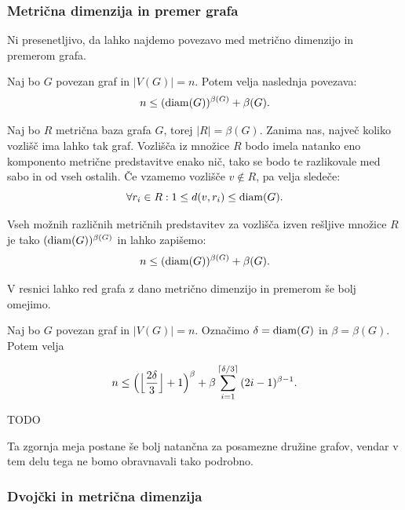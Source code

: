 \documentclass[mat1, tisk]{fmfdelo}
\newcommand{\1}{(1, 1, \ldots, 1)}
\newcommand{\2}{(2, 2, \ldots, 2)}
\begin{document}
\subsubsection{Metrična dimenzija in premer grafa} \label{ss:mdim_premer}

Ni presenetljivo, da lahko najdemo povezavo med metrično dimenzijo in premerom grafa.

\begin{trditev}\label{trd:groba_meja_mdim_premer}
    Naj bo $G$ povezan graf in $|V(G)| = n$. Potem velja naslednja povezava:
    $$n \leq ({\rm diam}(G))^{\beta (G)} + \beta (G). $$
\end{trditev}

\begin{dokaz}
    Naj bo $R$ metrična baza grafa $G$, torej $|R| = \beta(G).$ Zanima nas, največ koliko 
    vozlišč ima lahko tak graf. Vozlišča iz množice $R$ bodo imela natanko eno 
    komponento metrične predstavitve enako nič, tako se bodo te razlikovale med sabo in od
    vseh ostalih. Če vzamemo vozlišče $v \notin R$, pa velja sledeče:
    $$\forall r_i \in R: 1 \leq d(v, r_i) \leq {\rm diam}(G).$$
    
    Vseh možnih različnih metričnih predstavitev za vozlišča izven rešljive množice $R$ 
    je tako $({\rm diam}(G))^{\beta (G)}$
    in lahko zapišemo:
    $$n \leq ({\rm diam}(G))^{\beta (G)} + \beta (G).$$
\end{dokaz}

V resnici lahko red grafa z dano metrično dimenzijo in premerom še bolj omejimo.

\begin{trditev} \label{trd:meja_mdim_premer}
    Naj bo $G$ povezan graf in $|V(G)| = n$. Označimo $ \delta = {\rm diam}(G)$ in 
    $\beta = \beta (G)$. Potem velja

    $$n \leq \Bigl ( \Bigl \lfloor {\frac{2 \delta}{3}}\Bigr \rfloor + 1 \Bigr )^{\beta} + 
    \beta \sum_{i = 1}^{\lceil \delta /3 \rceil} {(2i - 1)^{\beta - 1}}. $$
\end{trditev}

\begin{dokaz}
    TODO
\end{dokaz}

Ta zgornja meja postane še bolj natančna za posamezne družine grafov, vendar v tem delu
tega ne bomo obravnavali tako podrobno.




\subsubsection{Dvojčki in metrična dimenzija} \label{ss:dvojcki_mdim}
\end{document}
